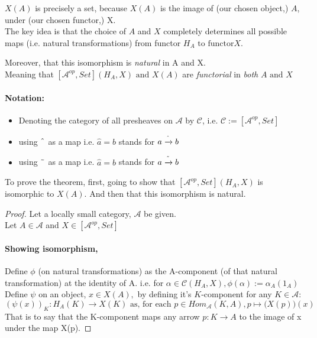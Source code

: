 \documentclass[18pt,a4paper]{article}
\theoremstyle{definition}
\begin{document}
$X(A)$ is precisely a set, because $X(A)$ is the image of (our chosen object,) $A$, under (our chosen functor,) X. \\

The key idea is that the choice of $A$ and $X$ completely determines all possible maps
(i.e. natural transformations) from functor $H_A \text{ to functor} X$.

Moreover, that this isomorphism is \textit{natural} in A and X. \\
Meaning that $[ \mathcal{A}^{op},Set](H_A,X) \text{ and } X(A)$ are
\textit{functorial} in \textit{both} $A \text{ and } X$

\paragraph{Notation:} \begin{itemize}
\item Denoting the category of all presheaves on $\mathcal{A} $ by $\mathcal{C}$,
	i.e. $\mathcal{C}:=[ \mathcal{A} ^{op}, Set] $
\item using $\string ^ $ as a map i.e. $\hat a = b$ stands for $a \xrightarrow{\string ^} b$
\item using $\string ~ $ as a map i.e. $\hat a = b$ stands for $a \xrightarrow{\string ~} b$
\end{itemize}

To prove the theorem, first,
going to show that $[ \mathcal{A} ^{op}, Set](H_A,X)$ is isomorphic to $X(A)$. And then that
this isomorphism is natural.

\begin{proof}Let a locally small category,  $\mathcal{A} $ be given. \\
	Let $A \in \mathcal{A} $ and $X \in [ \mathcal{A} ^{op}, Set]$\\

	\paragraph{Showing isomorphism,}


	Define $\phi$ (on natural transformations) as the A-component (of that natural transformation)
	at the identity of A. i.e. for $\alpha \in \mathcal{C}(H_A,X) ,
	\phi(\alpha):= \alpha_A(1_A) $ \\

	Define $\psi$ on an object, $ x \in X(A), $
	by defining it's $K$-component for any $K \in \mathcal{A} $:
	\[({\psi(x)})_K : H_A(K) \to X(K)
	\text{ as, for each } p\in Hom_{\mathcal{A} }(K,A), p \mapsto \Big(X(p)\Big)(x) \]
	That is to say that the K-component maps any arrow $p:K \to A$
	to the image of x under the map X(p).

\end{proof}
\end{document}
